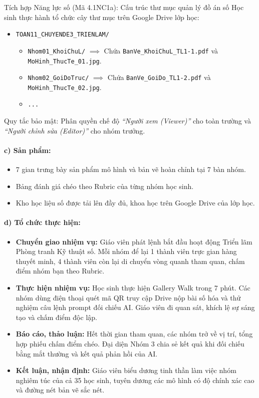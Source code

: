 \documentclass[12pt, a4paper]{article}
\begin{document}
\begin{pedabox}{Tích hợp Năng lực số (Mã 4.1NC1a): Cấu trúc thư mục quản lý đồ án số}
Học sinh thực hành tổ chức cây thư mục trên Google Drive lớp học:
\begin{itemize}[leftmargin=0.5cm]
    \item \texttt{TOAN11\_CHUYENDE3\_TRIENLAM/}
    \begin{itemize}[leftmargin=0.4cm]
        \item \texttt{Nhom01\_KhoiChuL/} $\implies$ Chứa \texttt{BanVe\_KhoiChuL\_TL1-1.pdf} và \texttt{MoHinh\_ThucTe\_01.jpg}.
        \item \texttt{Nhom02\_GoiDoTruc/} $\implies$ Chứa \texttt{BanVe\_GoiDo\_TL1-2.pdf} và \texttt{MoHinh\_ThucTe\_02.jpg}.
        \item \texttt{...}
    \end{itemize}
\end{itemize}
Quy tắc bảo mật: Phân quyền chế độ \textit{``Người xem (Viewer)''} cho toàn trường và \textit{``Người chỉnh sửa (Editor)''} cho nhóm trưởng.
\end{pedabox}

\paragraph{c) Sản phẩm:}
\begin{itemize}[leftmargin=0.8cm]
    \item 7 gian trưng bày sản phẩm mô hình và bản vẽ hoàn chỉnh tại 7 bàn nhóm.
    \item Bảng đánh giá chéo theo Rubric của từng nhóm học sinh.
    \item Kho học liệu số được tải lên đầy đủ, khoa học trên Google Drive của lớp học.
\end{itemize}

\paragraph{d) Tổ chức thực hiện:}
\begin{itemize}[leftmargin=0.8cm]
    \item \textbf{Chuyển giao nhiệm vụ:} Giáo viên phát lệnh bắt đầu hoạt động Triển lãm Phòng tranh Kỹ thuật số. Mỗi nhóm để lại 1 thành viên trực gian hàng thuyết minh, 4 thành viên còn lại di chuyển vòng quanh tham quan, chấm điểm nhóm bạn theo Rubric.
    \item \textbf{Thực hiện nhiệm vụ:} Học sinh thực hiện Gallery Walk trong 7 phút. Các nhóm dùng điện thoại quét mã QR truy cập Drive nộp bài số hóa và thử nghiệm câu lệnh prompt đối chiếu AI. Giáo viên đi quan sát, khích lệ sự sáng tạo và chấm điểm độc lập.
    \item \textbf{Báo cáo, thảo luận:} Hết thời gian tham quan, các nhóm trở về vị trí, tổng hợp phiếu chấm điểm chéo. Đại diện Nhóm 3 chia sẻ kết quả khi đối chiếu bằng mắt thường và kết quả phản hồi của AI.
    \item \textbf{Kết luận, nhận định:} Giáo viên biểu dương tinh thần làm việc nhóm nghiêm túc của cả 35 học sinh, tuyên dương các mô hình có độ chính xác cao và đường nét bản vẽ sắc nét.
\end{itemize}
\end{document}
